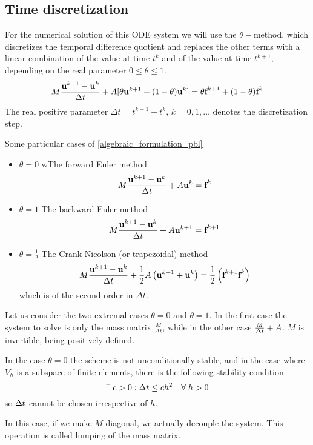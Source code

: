 \subsection{Time discretization}
For the numerical solution of this ODE system we will use the \(\theta-\)method, which discretizes the temporal difference quotient and replaces the other terms with a linear combination of the value at time \(t^k\) and of the value at time \(t^{k+1}\), depending on the real parameter \(0 \leq \theta \leq 1\).
\begin{equation}
    M\frac{\textbf{u}^{k+1} - \textbf{u}^k}{\Delta t} + A[\theta \textbf{u}^{k+1} + (1-\theta)\textbf{u}^k] = \theta \textbf{f}^{k+1} + (1-\theta)\textbf{f}^k
    \label{theta_method_pbl}
\end{equation}
The real positive parameter \(\Delta t = t^{k+1}-t^k\), \(k=0,1,\ldots\) denotes the discretization step.

Some particular cases of \eqref{algebraic_formulation_pbl} 
\begin{itemize}
    \item \(\theta = 0\) wThe forward Euler method 
    \[
        M\frac{\textbf{u}^{k+1}-\textbf{u}^k}{\Delta t} + A\textbf{u}^{k} = \textbf{f}^k
    \]
    \item \(\theta = 1\) The backward Euler method 
    \[
        M\frac{\textbf{u}^{k+1}-\textbf{u}^k}{\Delta t} + A\textbf{u}^{k+1} = \textbf{f}^{k+1}        
    \]
    \item \(\theta = \frac{1}{2}\) The Crank-Nicolson (or trapezoidal) method
    \[
        M\frac{\textbf{u}^{k+1}-\textbf{u}^k}{\Delta t} + \frac{1}{2}A\left( \textbf{u}^{k+1} + \textbf{u}^k \right) = \frac{1}{2}\left( \textbf{f}^{k+1} \textbf{f}^k \right)
    \]
    which is of the second order in \(\Delta t\). 
\end{itemize}
Let us consider the two extremal cases \(\theta = 0\) and \(\theta = 1\). In the first case the system to solve is only the mass matrix \(\frac{M}{\Delta t}\), while in the other case \(\frac{M}{\Delta t} + A\). \(M\) is invertible, being positively defined.

In the case \(\theta = 0\) the scheme is not unconditionally stable, and in the case where \(V_h\) is a subspace of finite elements, there is the following stability condition 
\[
    \exists \; c > 0 : \Delta t \leq ch^2 \quad \forall \; h > 0
\]
so \(\Delta t\) cannot be chosen irrespective of \(h\).

In this case, if we make \(M\) diagonal, we actually decouple the system. This operation is called lumping of the mass matrix.

